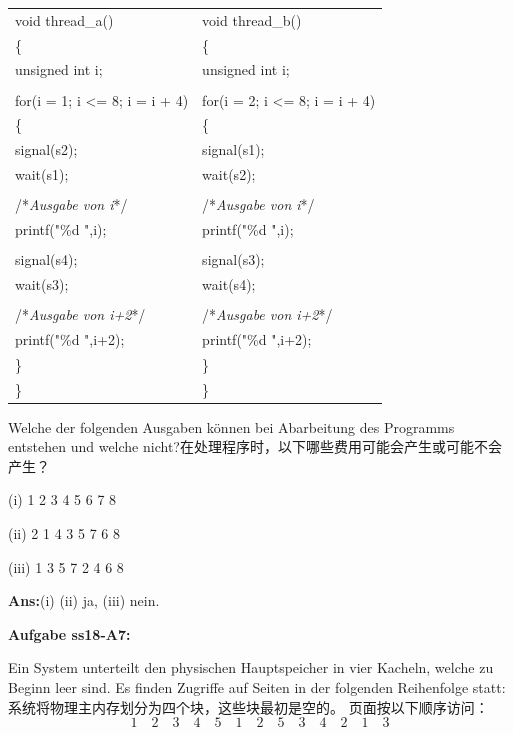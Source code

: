 \documentclass[fleqn]{article}
\begin{document}
\begin{center}
    \begin{tabular}{l|l}
        void thread\_a()&void thread\_b()\\
        \{&\{\\
        \qquad unsigned int i;&\qquad unsigned int i;\\
        \\
        \qquad for(i = 1; i <= 8; i = i + 4) &\qquad for(i = 2; i <= 8; i = i + 4)\\
        \qquad \{&\qquad \{\\
        \qquad\qquad signal(s2);&\qquad\qquad signal(s1);\\
        \qquad\qquad wait(s1);&\qquad\qquad wait(s2);\\
        \\
        \qquad\qquad /*\textit{Ausgabe von i}*/&\qquad\qquad /*\textit{Ausgabe von i}*/\\
        \qquad\qquad printf("\%d ",i);&\qquad\qquad printf("\%d ",i);\\
        \\
        \qquad\qquad signal(s4);&\qquad\qquad signal(s3);\\
        \qquad\qquad wait(s3);&\qquad\qquad wait(s4);\\
        \\
        \qquad\qquad /*\textit{Ausgabe von i+2}*/&\qquad\qquad /*\textit{Ausgabe von i+2}*/\\
        \qquad\qquad printf("\%d ",i+2);&\qquad\qquad printf("\%d ",i+2);\\
        \qquad\}&\qquad\}\\
        \}&\}
    \end{tabular}
\end{center}

Welche der folgenden Ausgaben können bei Abarbeitung des Programms entstehen und welche nicht?在处理程序时，以下哪些费用可能会产生或可能不会产生？

(i) 1 2 3 4 5 6 7 8

(ii) 2 1 4 3 5 7 6 8

(iii) 1 3 5 7 2 4 6 8

\textbf{Ans:}(i) (ii) ja, (iii) nein.

\noindent\textbf{Aufgabe ss18-A7:}

Ein System unterteilt den physischen Hauptspeicher in vier Kacheln, welche zu Beginn leer sind. Es finden Zugriffe auf Seiten in der folgenden Reihenfolge statt:
系统将物理主内存划分为四个块，这些块最初是空的。 页面按以下顺序访问：
$$1\quad2\quad3\quad4\quad5\quad1\quad2\quad5\quad3\quad4\quad2\quad1\quad3$$
\end{document}
